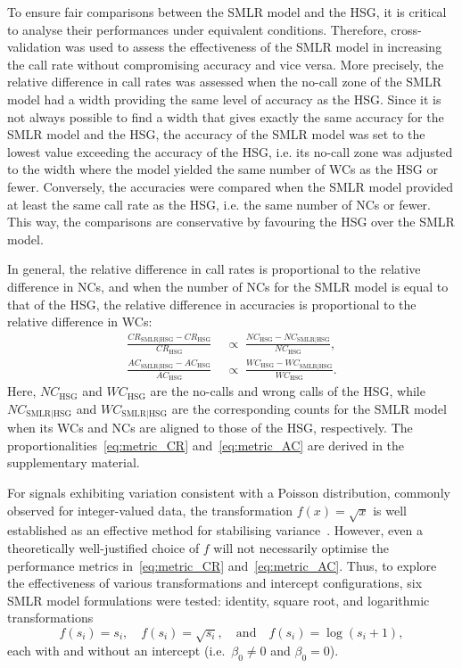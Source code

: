\documentclass[preprint,5p,times,11pt]{elsarticle}
\begin{document}
To ensure fair comparisons between the SMLR model and the HSG, it is critical to analyse their performances under equivalent conditions.
Therefore, cross-validation was used to assess the effectiveness of the SMLR model in increasing the call rate without compromising accuracy and vice versa.
More precisely, the relative difference in call rates was assessed when the no-call zone of the SMLR model had a width providing the same level of accuracy as the HSG.
Since it is not always possible to find a width that gives exactly the same accuracy for the SMLR model and the HSG, the accuracy of the SMLR model was set to the lowest value exceeding the accuracy of the HSG, i.e. its no-call zone was adjusted to the width where the model yielded the same number of WCs as the HSG or fewer.
Conversely, the accuracies were compared when the SMLR model provided at least the same call rate as the HSG, i.e. the same number of NCs or fewer.
This way, the comparisons are conservative by favouring the HSG over the SMLR model.

In general, the relative difference in call rates is proportional to the relative difference in NCs, and when the number of NCs for the SMLR model is equal to that of the HSG, the relative difference in accuracies is proportional to the relative difference in WCs:
\begin{align}
\frac{CR_{\text{SMLR}\mid\text{HSG}} - CR_{\text{HSG}}}{CR_{\text{HSG}}} \; &\propto \; \frac{NC_{\text{HSG}} - NC_{\text{SMLR}\mid\text{HSG}}}{NC_{\text{HSG}}},\label{eq:metric_CR} \\
\frac{AC_{\text{SMLR}\mid\text{HSG}} - AC_{\text{HSG}}}{AC_{\text{HSG}}} \; &\propto \; \frac{WC_{\text{HSG}} - WC_{\text{SMLR}\mid\text{HSG}}}{WC_{\text{HSG}}}.\label{eq:metric_AC}
\end{align}
Here, $NC_{\text{HSG}}$ and $WC_{\text{HSG}}$ are the no-calls and wrong calls of the HSG, while $NC_{\text{SMLR}\mid\text{HSG}}$ and $WC_{\text{SMLR}\mid\text{HSG}}$ are the corresponding counts for the SMLR model when its WCs and NCs are aligned to those of the HSG, respectively.
The proportionalities~\eqref{eq:metric_CR} and~\eqref{eq:metric_AC} are derived in the supplementary material.

For signals exhibiting variation consistent with a Poisson distribution, commonly observed for integer-valued data, the transformation $f(x) = \sqrt{x}$ is well established as an effective method for stabilising variance~\cite{bartlett}.
However, even a theoretically well-justified choice of $f$ will not necessarily optimise the performance metrics in~\eqref{eq:metric_CR} and~\eqref{eq:metric_AC}.
Thus, to explore the effectiveness of various transformations and intercept configurations, six SMLR model formulations were tested: identity, square root, and logarithmic transformations
\begin{equation*}
f(s_i) = s_i, \quad f(s_i) = \sqrt{s_i}, \quad \text{and} \quad f(s_i) = \log(s_i+1),
\end{equation*}
each with and without an intercept (i.e.~$\beta_0 \neq 0$ and $\beta_0 = 0$).
\end{document}
